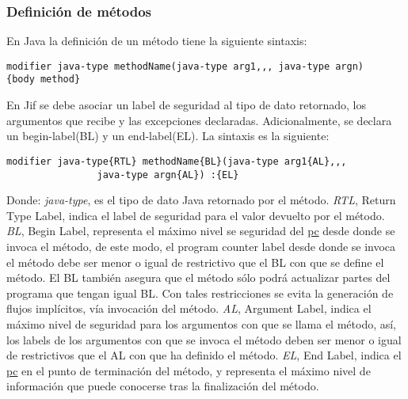 \subsubsection{Definición de métodos}
En Java la definición de un método tiene la siguiente sintaxis:
\begin{lstlisting}
modifier java-type methodName(java-type arg1,,, java-type argn)
{body method}
\end{lstlisting}
En Jif se debe asociar un label de seguridad al tipo de
dato retornado, los argumentos que recibe y las excepciones declaradas.
Adicionalmente, se declara un begin-label(BL) y un end-label(EL). 
La sintaxis es la siguiente:
\begin{lstlisting}
modifier java-type{RTL} methodName{BL}(java-type arg1{AL},,,
				java-type argn{AL}) :{EL}
\end{lstlisting}
Donde: \emph{java-type}, es el tipo de dato Java retornado por el
método.\newline 
\emph{RTL}, Return Type Label, indica el label de seguridad para el valor
devuelto por el método.\newline 
\emph{BL}, Begin Label, representa el máximo nivel se seguridad del
\underline{pc} desde donde se invoca el método, de este modo,
el program counter label desde donde se invoca el método debe ser menor o igual
de restrictivo que el BL con que se define el método. El BL también asegura que
el método sólo podrá actualizar partes del programa que tengan igual BL. Con
tales restricciones se evita la generación de flujos implícitos, vía invocación
del método.\newline
\emph{AL}, Argument Label, indica el máximo nivel de seguridad para los
argumentos con que se llama el método, así, los labels de los argumentos con que se
invoca el método deben ser menor o igual de restrictivos que el AL con que ha
definido el método.\newline 
\emph{EL}, End Label, indica el \underline{pc} en el punto de terminación del
método, y representa el máximo nivel de información que puede conocerse tras la
finalización del método.


